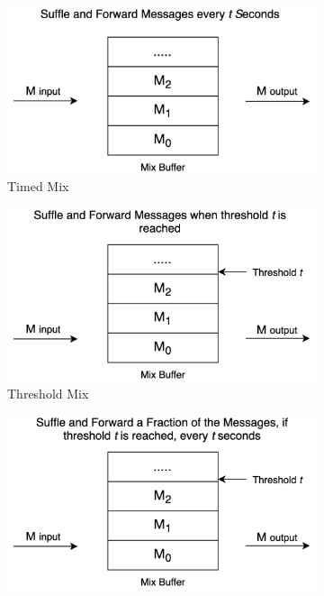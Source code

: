 \documentclass[logo,msc,cyber]{infthesis}   %
\begin{document}
\begin{figure}[h!]
    \centering
    \begin{subfigure}[b]{0.45\textwidth}
        \centering
        \includegraphics[width=\textwidth]{figures/mixing_techniques/timed.png}
        \caption{Timed Mix}
        \label{fig:timed-mix}
    \end{subfigure}
    \hfill
    \begin{subfigure}[b]{0.45\textwidth}
        \centering
        \includegraphics[width=\textwidth]{figures/mixing_techniques/threshold.png}
        \caption{Threshold Mix}
        \label{fig:threshold-mix}
    \end{subfigure}
    \hfill
    \begin{subfigure}[b]{0.45\textwidth}
        \centering
        \includegraphics[width=\textwidth]{figures/mixing_techniques/pool.png}

\end{subfigure}
\end{figure}
\end{document}
